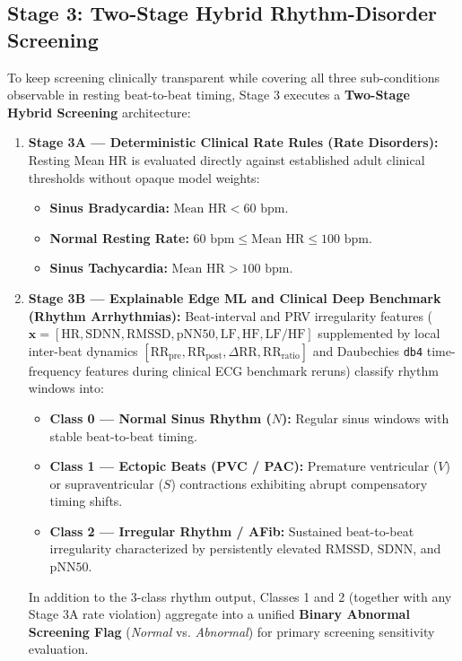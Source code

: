 \subsection{Stage 3: Two-Stage Hybrid Rhythm-Disorder Screening}
To keep screening clinically transparent while covering all three sub-conditions observable in resting beat-to-beat timing, Stage 3 executes a \textbf{Two-Stage Hybrid Screening} architecture:
\begin{enumerate}
	\item \textbf{Stage 3A --- Deterministic Clinical Rate Rules (Rate Disorders):} Resting Mean HR is evaluated directly against established adult clinical thresholds without opaque model weights:
	\begin{itemize}
		\item \textbf{Sinus Bradycardia:} $\text{Mean HR} < 60\text{ bpm}$.
		\item \textbf{Normal Resting Rate:} $60\text{ bpm} \le \text{Mean HR} \le 100\text{ bpm}$.
		\item \textbf{Sinus Tachycardia:} $\text{Mean HR} > 100\text{ bpm}$.
	\end{itemize}
	\item \textbf{Stage 3B --- Explainable Edge ML and Clinical Deep Benchmark (Rhythm Arrhythmias):} Beat-interval and PRV irregularity features ($\mathbf{x} = [\text{HR}, \text{SDNN}, \text{RMSSD}, \text{pNN50}, \text{LF}, \text{HF}, \text{LF/HF}]$ supplemented by local inter-beat dynamics $[\text{RR}_{\text{pre}}, \text{RR}_{\text{post}}, \Delta\text{RR}, \text{RR}_{\text{ratio}}]$ and Daubechies \texttt{db4} time-frequency features during clinical ECG benchmark reruns) classify rhythm windows into:
	\begin{itemize}
		\item \textbf{Class 0 --- Normal Sinus Rhythm ($N$):} Regular sinus windows with stable beat-to-beat timing.
		\item \textbf{Class 1 --- Ectopic Beats (PVC / PAC):} Premature ventricular ($V$) or supraventricular ($S$) contractions exhibiting abrupt compensatory timing shifts.
		\item \textbf{Class 2 --- Irregular Rhythm / AFib:} Sustained beat-to-beat irregularity characterized by persistently elevated $\text{RMSSD}$, $\text{SDNN}$, and $\text{pNN50}$.
	\end{itemize}
	In addition to the 3-class rhythm output, Classes 1 and 2 (together with any Stage 3A rate violation) aggregate into a unified \textbf{Binary Abnormal Screening Flag} (\textit{Normal} vs. \textit{Abnormal}) for primary screening sensitivity evaluation.

\end{enumerate}
